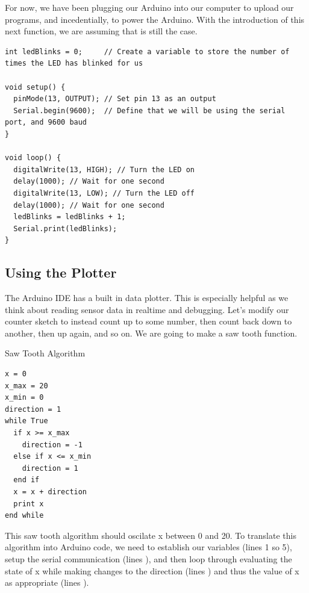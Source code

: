 \documentclass[11pt]{book}
\begin{document}
For now, we have been plugging our Arduino into our computer to upload our programs, and incedentially, to power the Arduino.  With the introduction of this next function, we are assuming that is still the case.

\begin{minipage}{\linewidth}
\begin{lstlisting}[style=myArduino]
int ledBlinks = 0;     // Create a variable to store the number of times the LED has blinked for us

void setup() {
  pinMode(13, OUTPUT); // Set pin 13 as an output
  Serial.begin(9600);  // Define that we will be using the serial port, and 9600 baud
}

void loop() {
  digitalWrite(13, HIGH); // Turn the LED on
  delay(1000); // Wait for one second
  digitalWrite(13, LOW); // Turn the LED off
  delay(1000); // Wait for one second
  ledBlinks = ledBlinks + 1;
  Serial.print(ledBlinks);
}
\end{lstlisting}
\end{minipage}

\subsection{Using the Plotter}
The Arduino IDE has a built in data plotter.  This is especially helpful as we think about reading sensor data in realtime and debugging.  Let's modify our counter sketch to instead count up to some number, then count back down to another, then up again, and so on.  We are going to make a saw tooth function.

\begin{minipage}{\linewidth}
Saw Tooth Algorithm
\begin{lstlisting}[style=pseudocode]
x = 0
x_max = 20
x_min = 0
direction = 1
while True
  if x >= x_max
    direction = -1
  else if x <= x_min
    direction = 1
  end if
  x = x + direction
  print x
end while
\end{lstlisting}
\end{minipage}

This saw tooth algorithm should oscilate x between 0 and 20.  To translate this algorithm into Arduino code, we need to establish our variables (lines 1 so 5), setup the serial communication (lines ), and then loop through evaluating the state of x while making changes to the direction (lines ) and thus the value of x as appropriate (lines ).
\end{document}
